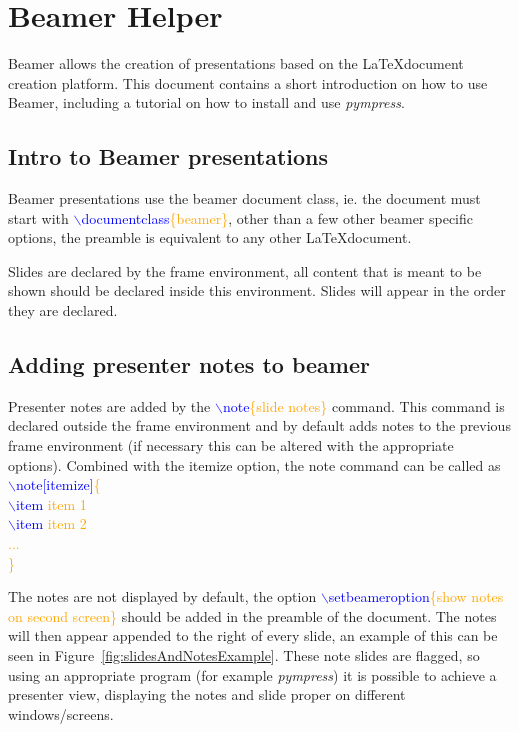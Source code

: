 \graphicspath{{./chapter/beamer/figures/}}
\chapter{Beamer Helper}

Beamer allows the creation of presentations based on the \LaTeX document creation platform. This document contains a short introduction on how to use Beamer, including a tutorial on how to install and use \textit{pympress}.

\section{Intro to Beamer presentations}

Beamer presentations use the beamer document class, ie. the document must start with
\textcolor{blue}{$\backslash$documentclass}\textcolor{orange}{\{beamer\}},
other than a few other beamer specific options, the preamble is equivalent to any other \LaTeX document.
\par
Slides are declared by the frame environment, all content that is meant to be shown should be declared inside this environment. Slides will appear in the order they are declared.

\section{Adding presenter notes to beamer}

Presenter notes are added by the
\textcolor{blue}{$\backslash$note}\textcolor{orange}{\{slide notes\}}
command. This command is declared outside the frame environment and by default adds notes to the previous frame environment (if necessary this can be altered with the appropriate options). Combined with the itemize option, the note command can be called as
\\
\textcolor{blue}{$\backslash$note[itemize]}\textcolor{orange}{\{\\
\textcolor{blue}{$\backslash$item} item 1\\
\textcolor{blue}{$\backslash$item} item 2\\
...\\
\}}
\par
The notes are not displayed by default, the option \textcolor{blue}{$\backslash$setbeameroption}\textcolor{orange}{\{show notes on second screen\}}
should be added in the preamble of the document. The notes will then appear appended to the right of every slide, an example of this can be seen in Figure~\ref{fig:slidesAndNotesExample}. These note slides are flagged, so using an appropriate program (for example \textit{pympress}) it is possible to achieve a presenter view, displaying the notes and slide proper on different windows/screens.

